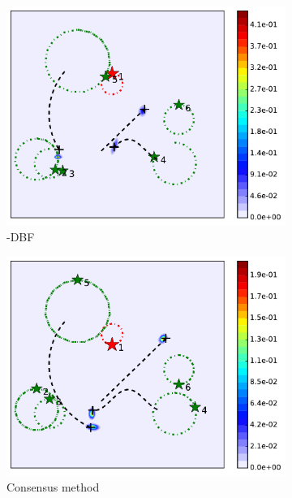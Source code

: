 \begin{figure}
\begin{subfigure}[b]{0.23\textwidth}
			\includegraphics[width=\textwidth]{figures/hetero_mov_sen_mov_tar_rbt1_step20}
			\caption{\proto-DBF}\label{fig:sta_sen_sta_tar_top1_dbf}
		\end{subfigure}
		\begin{subfigure}[b]{0.23\textwidth}
			\includegraphics[width=\textwidth]{figures/hetero_mov_sen_mov_tar_rbt1_step30}
			\caption{Consensus method}\label{fig:sta_sen_sta_tar_top1_cons}
		\end{subfigure}
		\begin{subfigure}[b]{0.23\textwidth}

\end{subfigure}
\end{figure}
